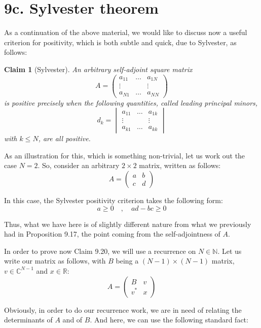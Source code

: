 \documentclass[12pt]{amsbook}
\newtheorem{claim}[theorem]{Claim}
\begin{document}
\section*{9c. Sylvester theorem}

As a continuation of the above material, we would like to discuss now a useful criterion for positivity, which is both subtle and quick, due to Sylvester, as follows:

\begin{claim}[Sylvester]
An arbitrary self-adjoint square matrix
$$A=\begin{pmatrix}
a_{11}&\ldots&a_{1N}\\
\vdots&&\vdots\\
a_{N1}&\ldots&a_{NN}\end{pmatrix}$$
is positive precisely when the following quantities, called leading principal minors,
$$d_k=\begin{vmatrix}
a_{11}&\ldots&a_{1k}\\
\vdots&&\vdots\\
a_{k1}&\ldots&a_{kk}\end{vmatrix}$$
with $k\leq N$, are all positive.
\end{claim}

As an illustration for this, which is something non-trivial, let us work out the case $N=2$. So, consider an arbitrary $2\times2$ matrix, written as follows:
$$A=\begin{pmatrix}
a&b\\ c&d\end{pmatrix}$$

In this case, the Sylvester positivity criterion takes the following form:
$$a\geq 0\quad,\quad ad-bc\geq0$$

Thus, what we have here is of slightly different nature from what we previously had in Proposition 9.17, the point coming from the self-adjointness of $A$.

\bigskip

In order to prove now Claim 9.20, we will use a recurrence on $N\in\mathbb N$. Let us write our matrix as follows, with $B$ being a $(N-1)\times(N-1)$ matrix, $v\in\mathbb C^{N-1}$ and $x\in\mathbb R$:
$$A=\begin{pmatrix}
B&v\\
v^*&x\end{pmatrix}$$

Obviously, in order to do our recurrence work, we are in need of relating the determinants of $A$ and of $B$. And here, we can use the following standard fact:
\end{document}
